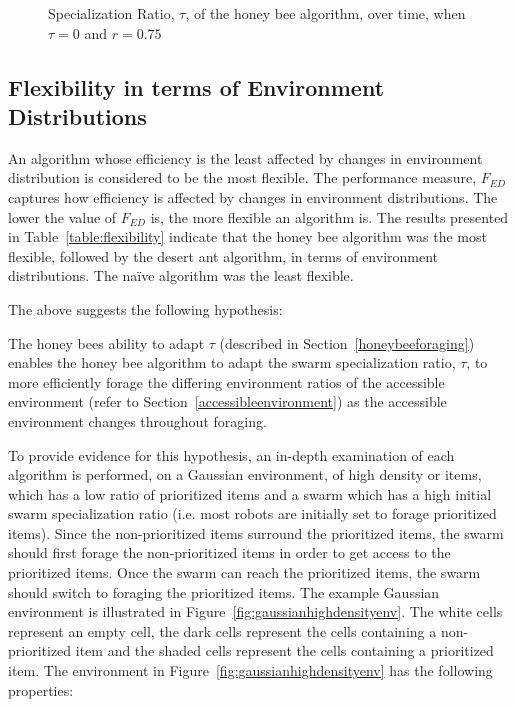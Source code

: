 
\begin{figure}[!htb]
\centering
\resizebox{\textwidth}{!}{}
\caption{Specialization Ratio, $\tau$, of the honey bee algorithm, over time, when $\tau=0$ and $r=0.75$}
\label{fig:specializationratioovertime}
\end{figure}


\subsection{Flexibility in terms of Environment Distributions}
\label{results:flexibility:environmentdistribution}


An algorithm whose efficiency is the least affected by changes in environment distribution is considered to be the most flexible. The performance measure, $F_{ED}$ captures how efficiency is affected by changes in environment distributions. The lower the value of $F_{ED}$ is, the more flexible an algorithm is. The results presented in Table~\ref{table:flexibility} indicate that the honey bee algorithm was the most flexible, followed by the desert ant algorithm, in terms of environment distributions. The na\"ive algorithm was the least flexible.


The above suggests the following hypothesis:

The honey bees ability to adapt $\tau$ (described in Section~\ref{honeybeeforaging}) enables the honey bee algorithm to adapt the swarm specialization ratio, $\tau$, to more efficiently forage the differing environment ratios of the accessible environment (refer to Section~\ref{accessibleenvironment}) as the accessible environment changes throughout foraging.

To provide evidence for this hypothesis, an in-depth examination of each algorithm is performed, on a Gaussian environment, of high density or items, which has a low ratio of prioritized items and a swarm which has a high initial swarm specialization ratio (i.e. most robots are initially set to forage prioritized items). Since the non-prioritized items surround the prioritized items, the swarm should first forage the non-prioritized items in order to get access to the prioritized items. Once the swarm can reach the prioritized items, the swarm should switch to foraging the prioritized items. The example Gaussian environment is illustrated in Figure~\ref{fig:gaussianhighdensityenv}. The white cells represent an empty cell, the dark cells represent the cells containing a non-prioritized item and the shaded cells represent the cells containing a prioritized item. The environment in Figure~\ref{fig:gaussianhighdensityenv} has the following properties:

